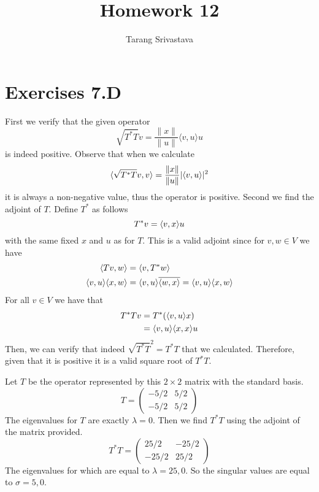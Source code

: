 \documentclass[10pt, twocolumn]{article}
\title{Homework 12}
\author{Tarang Srivastava}
\begin{document}
\makechaptertitle

\section{Exercises 7.D}
\begin{q}[1]
    First we verify that the given operator
    $$ \sqrt{T^{*} T} v=\frac{\|x\|}{\|u\|}\langle v, u\rangle u $$
    is indeed positive. 
    Observe that when we calculate 
    $$ \langle \sqrt{T^{*} T} v, v\rangle = \frac{\|x\|}{\|u\|}|\langle v, u\rangle|^2 $$
    it is always a non-negative value, thus the operator is positive.
    Second we find the adjoint of $ T $. 
    Define $ T^* $ as follows
    $$ T^*v = \langle v, x\rangle u $$
    with the same fixed $ x $ and $ u $ as for $ T $.
    This is a valid adjoint since for $ v, w \in V $ we have
    \begin{align*}
        \langle Tv, w\rangle &= \langle v, T^*w\rangle \\
        \langle v, u\rangle\langle x, w\rangle &= \langle v, u\rangle\overline{\langle w, x\rangle} = \langle v, u\rangle\langle x, w\rangle
    \end{align*}
    For all $ v \in V $ we have that 
    \begin{align*}
        T^* T v &= T^*(\langle v, u\rangle x) \\
        &= \langle v, u\rangle \langle x, x\rangle u
    \end{align*}
    Then, we can verify that indeed $ \sqrt{T^* T}^2 = T^*T $ that we calculated.
    Therefore, given that it is positive it is a valid square root of $ T^*T $.
\end{q}

\begin{q}[2]
    Let $ T $ be the operator represented by this $ 2 \times 2 $ matrix with the standard basis.
    $$
    T =
        \left(
        \begin{array}{cc}
            -5/2  & 5/2 \\
            -5/2 & 5/2
        \end{array}
        \right)
    $$
    The eigenvalues for $ T $ are exactly $ \lambda = 0 $.
    Then we find $ T^* T $ using the adjoint of the matrix provided. 
    $$ 
    T^* T = 
        \left(
        \begin{array}{cc}
            25/2  & -25/2 \\
            -25/2 & 25/2
        \end{array}
        \right)
    $$
    The eigenvalues for which are equal to $ \lambda = 25, 0 $. 
    So the singular values are equal to $ \sigma = 5, 0 $.
\end{q}
\end{document}
